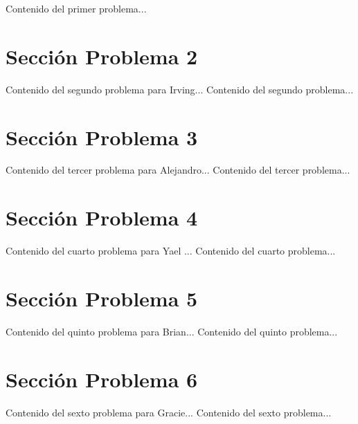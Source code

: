 \documentclass{IEEEcsmag}
\begin{document}
\newpage
Contenido del primer problema...
\newpage


\section{Sección Problema 2}
Contenido del segundo problema para Irving...
\newpage
Contenido del segundo problema...
\newpage


\section{Sección Problema 3}
Contenido del tercer problema para Alejandro...
\newpage 
Contenido del tercer problema...
\newpage 


\section{Sección Problema 4}
Contenido del cuarto problema para Yael ...
\newpage 
Contenido del cuarto problema...
\newpage 


\section{Sección Problema 5}
Contenido del quinto problema para Brian...
\newpage 
Contenido del quinto problema...
\newpage 


\section{Sección Problema 6}
Contenido del sexto problema para Gracie...
\newpage 
Contenido del sexto problema...
\newpage 
\end{document}
